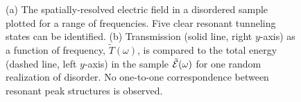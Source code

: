 \begin{figure}
\vskip -1in
\centerline{}
\centerline{}
\caption[(a) The spatially-resolved electric field in a disordered sample plotted for a range of frequencies.]{
(a) The spatially-resolved electric field in a disordered sample plotted for a range of frequencies. Five clear resonant tunneling states can be identified. 
(b) Transmission (solid line, right $y$-axis) as a function of frequency, $\tilde{T}(\omega)$, is compared to the total energy (dashed line, left $y$-axis) in the sample $\tilde{\cal E}(\omega)$ for one random realization of disorder. No one-to-one correspondence between resonant peak structures is observed.
\label{fig:electricFieldInSample}
}
\end{figure}

